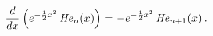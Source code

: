 \[\frac{d}{dx}\left(e^{-\frac{1}{2}x^{2}}\mathop{\mathit{He}_{n}\/}\nolimits\!%
\left(x\right)\right)=-e^{-\frac{1}{2}x^{2}}\mathop{\mathit{He}_{n+1}\/}%
\nolimits\!\left(x\right).\]